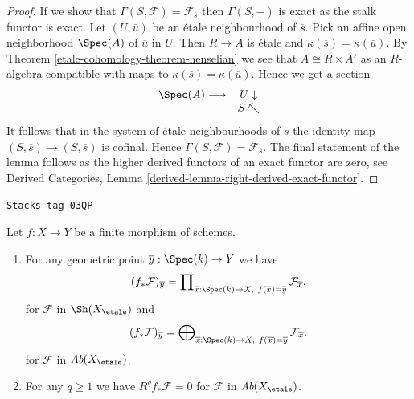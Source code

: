\begin{proof}
If we show that $\Gamma(S, \mathcal{F}) = \mathcal{F}_{\overline{s}}$
then $\Gamma(S, -)$ is exact as the stalk functor is exact.
Let $(U, \overline{u})$ be an \'etale neighbourhood of $\overline{s}$.
Pick an affine open neighborhood $\Spec(A)$ of $\overline{u}$ in $U$.
Then $R \to A$ is \'etale and $\kappa(\overline{s}) = \kappa(\overline{u})$.
By Theorem \ref{etale-cohomology-theorem-henselian} we see that $A \cong R \times A'$
as an $R$-algebra compatible with maps to
$\kappa(\overline{s}) = \kappa(\overline{u})$.
Hence we get a section
$$
\begin{array}{cc}\Spec(A) \longrightarrow & U \downarrow \\  & S \nwarrow\end{array}
$$
It follows that in the system of \'etale neighbourhoods of $\overline{s}$
the identity map $(S, \overline{s}) \to (S, \overline{s})$ is cofinal.
Hence $\Gamma(S, \mathcal{F}) = \mathcal{F}_{\overline{s}}$.
The final statement of the lemma follows as the higher derived
functors of an exact functor are zero, see
Derived Categories, Lemma \ref{derived-lemma-right-derived-exact-functor}.
\end{proof}

\begin{proposition}
\label{etale-cohomology-proposition-finite-higher-direct-image-zero}
\href{https://stacks.math.columbia.edu/tag/03QP}{\texttt{Stacks tag 03QP}}

Let $f : X \to Y$ be a finite morphism of schemes.
\begin{enumerate}
\item For any geometric point $\overline{y} : \Spec(k) \to Y$ we have
$$
(f_*\mathcal{F})_{\overline{y}} =
\prod\nolimits_{\overline{x} : \Spec(k) \to X,\ f(\overline{x}) =
\overline{y}} \mathcal{F}_{\overline{x}}.
$$
for $\mathcal{F}$ in $\Sh(X_\etale)$ and
$$
(f_*\mathcal{F})_{\overline{y}} =
\bigoplus\nolimits_{\overline{x} : \Spec(k) \to X,\ f(\overline{x}) =
\overline{y}} \mathcal{F}_{\overline{x}}.
$$
for $\mathcal{F}$ in $\textit{Ab}(X_\etale)$.
\item For any $q \geq 1$ we have $R^q f_*\mathcal{F} = 0$
for $\mathcal{F}$ in $\textit{Ab}(X_\etale)$.
\end{enumerate}
\end{proposition}


